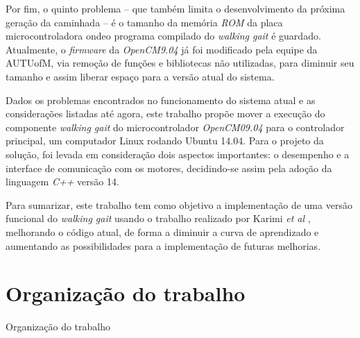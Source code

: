Por fim, o quinto problema -- que também limita o desenvolvimento da próxima geração da caminhada -- é o tamanho da memória \textit{ROM} da placa microcontroladora ondeo programa compilado do \textit{walking gait} é guardado. Atualmente, o \textit{firmware} da \textit{OpenCM9.04} já foi modificado pela equipe da AUTUofM, via remoção de funções e bibliotecas não utilizadas, para diminuir seu tamanho e  assim liberar espaço para a versão atual do sistema.

Dados os problemas encontrados no funcionamento do sistema atual e as considerações listadas até agora, este trabalho propõe mover a execução do componente \textit{walking gait} do microcontrolador \textit{OpenCM09.04} para o controlador principal, um computador Linux rodando Ubuntu 14.04. Para o projeto da solução, foi levada em consideração dois aspectos importantes: o desempenho e a interface de comunicação com os motores, decidindo-se assim pela adoção da linguagem \textit{C++} versão 14.

Para sumarizar, este trabalho tem como objetivo a implementação de uma versão funcional do \textit{walking gait} usando o trabalho realizado por Karimi \textit{et al} \cite{karimionline}, melhorando o código atual, de forma a diminuir a curva de aprendizado e aumentando as possibilidades para a implementação de futuras melhorias.

\section{Organização do trabalho}

Organização do trabalho